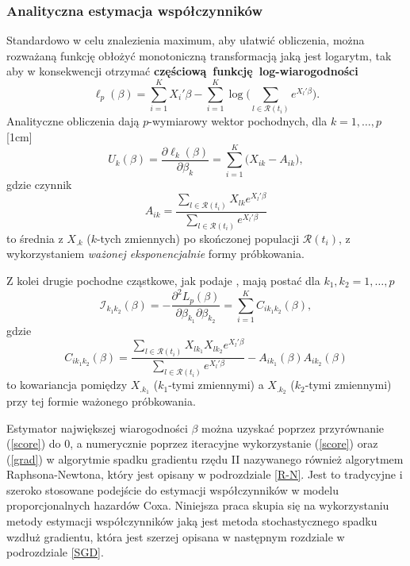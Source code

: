 \subsubsection{Analityczna estymacja współczynników}
Standardowo w celu znalezienia maximum, aby ułatwić obliczenia, można rozważaną funkcję obłożyć monotoniczną transformacją jaką jest logarytm, tak aby w konsekwencji otrzymać \textbf{częściową~funkcję~log-wiarogodności}
\begin{equation}
\ell_p(\beta) = \sum\limits_{i=1}^{K}X_i'\beta - \sum\limits_{i=1}^{K}\log\Big(\sum\limits_{l\in \mathscr{R}(t_i)}^{}e^{X_l'\beta}\Big).
\end{equation}
Analityczne obliczenia dają $p$-wymiarowy wektor pochodnych, dla $k=1,\dots,p$
[1cm]
\begin{equation}\label{score}
U_k(\beta)=\dfrac{\partial\ell_k(\beta)}{\partial\beta_k}=\sum\limits_{i=1}^{K}\Big(X_{ik}-A_{ik}\Big),
\end{equation}
gdzie czynnik
\begin{equation}
A_{ik} = \dfrac{\sum\limits_{l\in \mathscr{R}(t_i)}^{} X_{lk} e^{X_l'\beta}}{\sum\limits_{l\in \mathscr{R}(t_i)}^{} e^{X_l'\beta}}
\end{equation}
to średnia z $X_{.k}$ ($k$-tych zmiennych) po skończonej populacji $\mathscr{R}(t_i)$, z wykorzystaniem \textit{ważonej eksponencjalnie} formy próbkowania.

Z kolei drugie pochodne cząstkowe, jak podaje \cite{cox}, mają postać dla $k_1,k_2=1,\dots,p$
\begin{equation}\label{grad}
\mathscr{I}_{k_1k_2}(\beta) = - \dfrac{\partial^2L_p(\beta)}{\partial\beta_{k_1}\partial\beta_{k_2}}=\sum\limits_{i=1}^{K}C_{ik_1k_2}(\beta),
\end{equation}
gdzie
\begin{equation}
C_{ik_1k_2}(\beta)=\dfrac{\sum\limits_{l\in \mathscr{R}(t_i)}^{} X_{lk_1}X_{lk_2}e^{X_l'\beta}}{\sum\limits_{l\in \mathscr{R}(t_i)}^{} e^{X_l'\beta}} - A_{ik_1}(\beta)A_{ik_2}(\beta)
\end{equation}
to kowariancja pomiędzy $X_{.k_1}$ ($k_1$-tymi zmiennymi) a $X_{.k_2}$ ($k_2$-tymi zmiennymi) przy tej formie ważonego próbkowania.

Estymator największej wiarogodności $\beta$ można uzyskać poprzez przyrównanie (\ref{score}) do $0$, a numerycznie poprzez iteracyjne wykorzystanie (\ref{score}) oraz (\ref{grad}) w algorytmie spadku gradientu rzędu II nazywanego również algorytmem Raphsona-Newtona, który jest opisany w podrozdziale \ref{R-N}. Jest to tradycyjne i szeroko stosowane podejście do estymacji współczynników w modelu proporcjonalnych hazardów Coxa. Niniejsza praca skupia się na wykorzystaniu metody estymacji współczynników jaką jest metoda stochastycznego spadku wzdłuż gradientu, która jest szerzej opisana w następnym rozdziale w podrozdziale \ref{SGD}.

